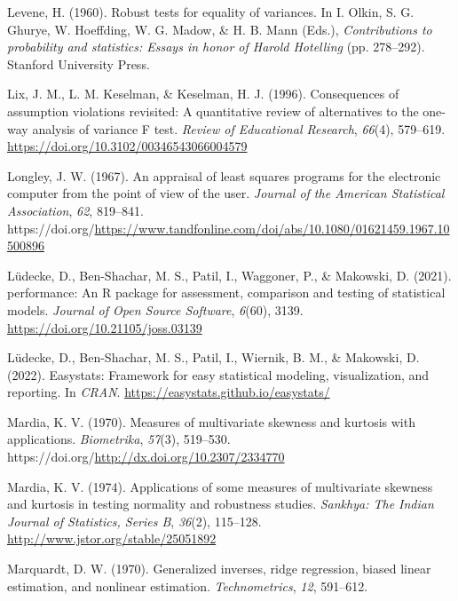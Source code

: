 \documentclass[
  letterpaper,
  10pt,
  krantz2]{krantz}
\newlength{\cslhangindent}
\newlength{\cslentryspacingunit} %
\newenvironment{CSLReferences}[2] %
 {%
  \setlength{\parindent}{0pt}
  \ifodd #1
  \let\oldpar\par
  \def\par{\hangindent=\cslhangindent\oldpar}
  \fi
  \setlength{\parskip}{#2\cslentryspacingunit}
 }%
 {}
\begin{document}
\begin{CSLReferences}{1}{0}
\leavevmode{}%
Levene, H. (1960). Robust tests for equality of variances. In I. Olkin,
S. G. Ghurye, W. Hoeffding, W. G. Madow, \& H. B. Mann (Eds.),
\emph{Contributions to probability and statistics: Essays in honor of
{Harold Hotelling}} (pp. 278--292). Stanford University Press.

\leavevmode{}%
Lix, J. M., L. M. Keselman, \& Keselman, H. J. (1996). Consequences of
assumption violations revisited: A quantitative review of alternatives
to the one-way analysis of variance {F} test. \emph{Review of
Educational Research}, \emph{66}(4), 579--619.
\url{https://doi.org/10.3102/00346543066004579}

\leavevmode{}%
Longley, J. W. (1967). An appraisal of least squares programs for the
electronic computer from the point of view of the user. \emph{Journal of
the American Statistical Association}, \emph{62}, 819--841.
https://doi.org/\url{https://www.tandfonline.com/doi/abs/10.1080/01621459.1967.10500896}

\leavevmode{}%
Lüdecke, D., Ben-Shachar, M. S., Patil, I., Waggoner, P., \& Makowski,
D. (2021). {performance}: An {R} package for assessment, comparison and
testing of statistical models. \emph{Journal of Open Source Software},
\emph{6}(60), 3139. \url{https://doi.org/10.21105/joss.03139}

\leavevmode{}%
Lüdecke, D., Ben-Shachar, M. S., Patil, I., Wiernik, B. M., \& Makowski,
D. (2022). Easystats: Framework for easy statistical modeling,
visualization, and reporting. In \emph{CRAN}.
\url{https://easystats.github.io/easystats/}

\leavevmode{}%
Mardia, K. V. (1970). Measures of multivariate skewness and kurtosis
with applications. \emph{Biometrika}, \emph{57}(3), 519--530.
https://doi.org/\url{http://dx.doi.org/10.2307/2334770}

\leavevmode{}%
Mardia, K. V. (1974). Applications of some measures of multivariate
skewness and kurtosis in testing normality and robustness studies.
\emph{Sankhya: The Indian Journal of Statistics, Series B},
\emph{36}(2), 115--128. \url{http://www.jstor.org/stable/25051892}

\leavevmode{}%
Marquardt, D. W. (1970). Generalized inverses, ridge regression, biased
linear estimation, and nonlinear estimation. \emph{Technometrics},
\emph{12}, 591--612.


\end{CSLReferences}
\end{document}
